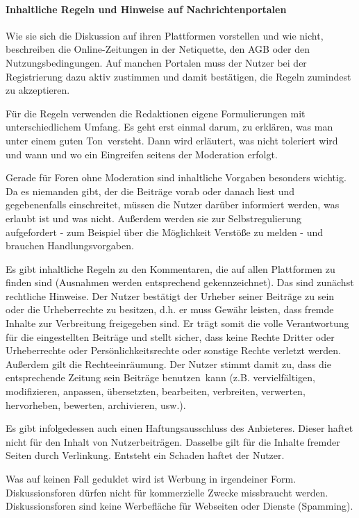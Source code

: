 \paragraph{Inhaltliche Regeln und Hinweise auf Nachrichtenportalen}

Wie sie sich die Diskussion auf ihren Plattformen vorstellen und wie nicht,
beschreiben die Online-Zeitungen in der Netiquette, den AGB oder den
Nutzungsbedingungen. Auf manchen Portalen muss der Nutzer bei der Registrierung
dazu aktiv zustimmen und damit bestätigen, die Regeln zumindest zu akzeptieren.

Für die Regeln verwenden die Redaktionen eigene Formulierungen mit
unterschiedlichem Umfang. Es geht erst einmal darum, zu erklären, was man unter
einem \glqq guten Ton\grqq\ versteht. Dann wird erläutert, was nicht toleriert
wird und wann und wo ein Eingreifen seitens der Moderation erfolgt.

Gerade für Foren ohne Moderation sind inhaltliche Vorgaben besonders wichtig. Da
es niemanden gibt, der die Beiträge vorab oder danach liest und gegebenenfalls
einschreitet, müssen die Nutzer darüber informiert werden, was erlaubt ist und
was nicht. Außerdem werden sie zur Selbstregulierung aufgefordert - zum Beispiel
über die Möglichkeit Verstöße zu melden - und brauchen Handlungsvorgaben.

Es gibt inhaltliche Regeln zu den Kommentaren, die auf allen Plattformen zu
finden sind (Ausnahmen werden entsprechend gekennzeichnet).  Das sind zunächst
rechtliche Hinweise. Der Nutzer bestätigt der Urheber seiner Beiträge zu sein
oder die Urheberrechte zu besitzen, d.h. er muss Gewähr leisten, dass fremde
Inhalte zur Verbreitung freigegeben sind. Er trägt somit die volle Verantwortung
für die eingestellten Beiträge und stellt sicher, dass keine Rechte Dritter oder
Urheberrechte oder Persönlichkeitsrechte oder sonstige Rechte verletzt werden.
Außerdem gilt die Rechteeinräumung. Der Nutzer stimmt damit zu, dass die
entsprechende Zeitung sein Beiträge \glqq benutzen\grqq\ kann (z.B. vervielfältigen,
modifizieren, anpassen, übersetzten, bearbeiten, verbreiten, verwerten,
hervorheben, bewerten, archivieren, usw.).

Es gibt infolgedessen auch einen Haftungsausschluss des Anbieteres. Dieser
haftet nicht für den Inhalt von Nutzerbeiträgen. Dasselbe gilt für die Inhalte
fremder Seiten durch Verlinkung. Entsteht ein Schaden haftet der Nutzer.

Was auf keinen Fall geduldet wird ist Werbung in irgendeiner Form.
Diskussionsforen dürfen nicht für kommerzielle Zwecke missbraucht werden.
Diskussionsforen sind keine Werbefläche für Webseiten oder Dienste (Spamming).

